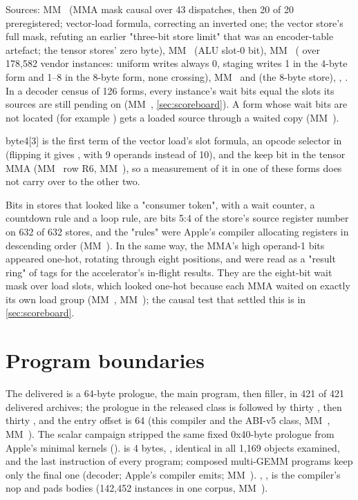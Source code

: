 Sources: MM~ (MMA mask causal over 43 dispatches, then 20 of 20 preregistered; vector-load formula, correcting an
inverted one; the vector store's full mask, refuting an earlier "three-bit store limit" that was an encoder-table
artefact; the tensor stores' zero byte), MM~ (ALU slot-0 bit), MM~ ( over
178,582 vendor instances: uniform writes always 0, staging writes 1 in the 4-byte form and 1–8 in the 8-byte form, none
crossing), MM~ and  (the 8-byte store), , .
In a decoder census of 126 forms, every instance's wait bits equal the slots its sources are still pending on
(MM~, \cref{sec:scoreboard}). A form whose wait bits are not located (for example ) gets a loaded source through a waited copy (MM~).

byte4{[}3{]} is the first term of the vector load's slot formula, an opcode selector
in  (flipping it gives , with 9 operands instead of 10), and the keep bit
in the tensor MMA (MM~ row R6, MM~), so a measurement of it in one of these forms does not carry
over to the other two.

Bits in stores that looked like a
"consumer token", with a wait counter, a countdown rule and a loop rule, are bits 5:4 of the store's source register
number on 632 of 632 stores, and the "rules" were Apple's compiler allocating registers in descending order
(MM~). In the same way, the MMA's high operand-1 bits appeared one-hot, rotating through eight positions, and were read as a
"result ring" of tags for the accelerator's in-flight results. They are the eight-bit wait mask over load slots, which
looked one-hot because each MMA waited on exactly its own load group (MM~, MM~); the causal test that
settled this is in \cref{sec:scoreboard}.

\section{Program boundaries}\label{sec:program-boundaries}

The delivered  is a 64-byte prologue, the main program, then filler, in 421 of 421 delivered archives;
the prologue in the released class is  followed by thirty ,  then thirty ,
and the entry offset is 64 (this compiler and the ABI-v5 class, MM~, MM~). The scalar campaign
stripped the same fixed 0x40-byte prologue from Apple's minimal kernels ().  is 4
bytes, , identical in all 1,169 objects examined, and the last instruction of every program; composed
multi-GEMM programs keep only the final one (decoder; Apple's compiler emits; MM~). , ,
is the compiler's nop and pads bodies (142,452 instances in one corpus, MM~).

